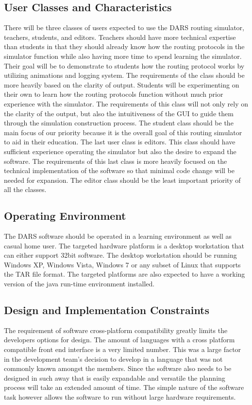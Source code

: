 \documentclass[a4paper,11pt,titlepage]{article}
\begin{document}
\subsection{User Classes and Characteristics}
There will be three classes of users expected to use the DARS routing simulator, teachers,
students, and editors. Teachers should have more technical expertise than students in that
they should already know how the routing protocols in the simulator function while also having
more time to spend learning the simulator. Their goal will be to demonstrate to students how
the routing protocol works by utilizing animations and logging system. The requirements of the
class should be more heavily based on the clarity of output. Students will be experimenting
on their own to learn how the routing protocols function without much prior experience with
the simulator. The requirements of this class will not only rely on the clarity of the output, but
also the intuitiveness of the GUI to guide them through the simulation construction process.
The student class should be the main focus of our priority because it is the overall goal of this
routing simulator to aid in their education. The last user class is editors. This class should
have sufficient experience operating the simulator but also the desire to expand the software.
The requirements of this last class is more heavily focused on the technical implementation
of the software so that minimal code change will be needed for expansion. The editor class
should be the least important priority of all the classes.

\subsection{Operating Environment}
The DARS software should be operated in a learning environment as well as casual home
user. The targeted hardware platform is a desktop workstation that can either support 32bit
software. The desktop workstation should be running Windows XP, Windows Vista, Windows
7 or any subset of Linux that supports the TAR file format. The targeted platforms are also
expected to have a working version of the java run-time environment installed.
\subsection{Design and Implementation Constraints}
The requirement of software cross-platform compatibility greatly limits the developers options
for design. The amount of languages with a cross platform compatible front end interface is
a very limited number. This was a large factor in the development team’s decision to develop
in a language that was not commonly known amongst the members. Since the software
also needs to be designed in such away that is easily expandable and versatile the planning
process will take an extended amount of time. The simple nature of the software task however
allows the software to run without large hardware requirements.
\end{document}
